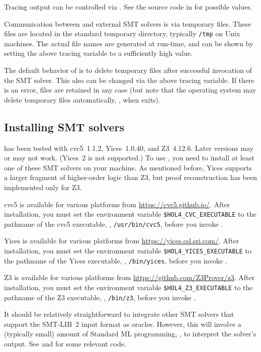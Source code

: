Tracing output can be controlled via .  See the source code in  for
possible values.

Communication between \HOL{} and external SMT solvers is via temporary
files.  These files are located in the standard temporary directory,
typically {\tt /tmp} on Unix machines.  The actual file names are
generated at run-time, and can be shown by setting the above tracing
variable to a sufficiently high value.

The default behavior of  is to delete temporary files
after successful invocation of the SMT solver.  This also can be
changed via the above tracing variable.  If there is an error, files
are retained in any case (but note that the operating system may
delete temporary files automatically, \eg, when \HOL{} exits).

\subsection{Installing SMT solvers}

 has been tested with cvc5~1.1.2, Yices~1.0.40, and
Z3~4.12.6. Later versions may or may not work.  (Yices~2 is not
supported.)  To use , you need to install at least one
of these SMT solvers on your machine.  As mentioned before, Yices
supports a larger fragment of higher-order logic than Z3, but proof
reconstruction has been implemented only for Z3.

cvc5 is available for various platforms from
\url{https://cvc5.github.io/}. After installation, you must set the
environment variable {\tt \$HOL4\_CVC\_EXECUTABLE} to the pathname of
the cvc5 executable, \eg, {\tt /usr/bin/cvc5}, before you invoke \HOL.

Yices is available for various platforms from
\url{https://yices.csl.sri.com/}.  After installation, you must set
the environment variable {\tt \$HOL4\_YICES\_EXECUTABLE} to the
pathname of the Yices executable, \eg, {\tt /bin/yices}, before you
invoke \HOL.

Z3 is available for various platforms from
\url{https://github.com/Z3Prover/z3}. After installation, you must set
the environment variable {\tt \$HOL4\_Z3\_EXECUTABLE} to the pathname
of the Z3 executable, \eg, {\tt /bin/z3}, before you invoke \HOL.

It should be relatively straightforward to integrate other SMT solvers
that support the SMT-LIB~2 input format as oracles.  However, this
will involve a (typically small) amount of Standard ML programming,
\eg, to interpret the solver's output.  See  and
 for some relevant code.

